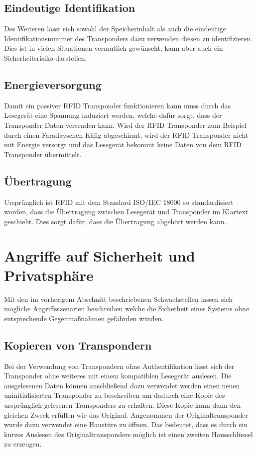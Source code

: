 \documentclass[conference]{IEEEtran}
\begin{document}
\subsection{Eindeutige Identifikation}
Des Weiteren lässt sich sowohl der Speicherinhalt als auch die eindeutige Identifikationsnummer des Transponders dazu verwenden diesen zu identifizieren. Dies ist in vielen Situationen vermutlich gewünscht, kann aber auch ein Sicherheitsrisiko darstellen.

\subsection{Energieversorgung}
Damit ein passiver RFID Transponder funktionieren kann muss durch das Lesegerät eine Spannung induziert werden, welche dafür sorgt, dass der Transponder Daten versenden kann. Wird der RFID Transponder zum Beispiel durch einen Faradayschen Käfig abgeschirmt, wird der RFID Transponder nicht mit Energie versorgt und das Lesegerät bekommt keine Daten von dem RFID Transponder übermittelt.

\subsection{Übertragung}
Ursprünglich ist RFID mit dem Standard ISO/IEC 18000 so standardisiert worden, dass die Übertragung zwischen Lesegerät und Transponder im Klartext geschieht. Dies sorgt dafür, dass die Übertragung abgehört werden kann.

\section{Angriffe auf Sicherheit und Privatsphäre}
Mit den im vorherigem Abschnitt beschriebenen Schwachstellen lassen sich mögliche Angriffsszenarien beschreiben welche die Sicherheit eines Systems ohne entsprechende Gegenmaßnahmen gefährden würden.

\subsection{Kopieren von Transpondern}
Bei der Verwendung von Transpondern ohne Authentifikation lässt sich der Transponder ohne weiteres mit einem kompatiblen Lesegerät auslesen. Die ausgelesenen Daten können anschließend dazu verwendet werden einen neuen uninitialisierten Transponder zu beschreiben um dadurch eine Kopie des ursprünglich gelesenen Transponders zu erhalten. Diese Kopie kann dann den gleichen Zweck erfüllen wie das Original. Angenommen der Originaltransponder wurde dazu verwendet eine Haustüre zu öffnen. Das bedeutet, dass es durch ein kurzes Auslesen des Originaltransponders möglich ist einen zweiten Hausschlüssel zu erzeugen. 
\end{document}
